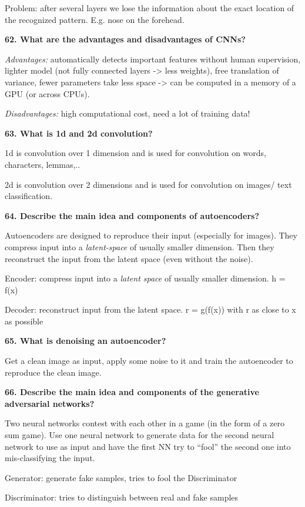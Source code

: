 Problem: after several layers we lose the information about the exact
location of the recognized pattern. E.g. nose on the forehead.

\textbf{62. What are the advantages and disadvantages of CNNs?}

\textit{Advantages:} automatically detects important features without
human supervision, lighter model (not fully connected layers
-\textgreater{} less weights), free translation of variance, fewer
parameters take less space -\textgreater{} can be computed in a memory
of a GPU (or across CPUs).

\textit{Disadvantages:} high computational cost, need a lot of
training data!

\textbf{63. What is 1d and 2d convolution?}

1d is convolution over 1 dimension and is used for convolution on words,
characters, lemmas,..

2d is convolution over 2 dimensions and is used for convolution on
images/ text classification.

\textbf{64. Describe the main idea and components of autoencoders?}

Autoencoders are designed to reproduce their input (especially for
images). They compress input into a \emph{latent-space} of usually
smaller dimension. Then they reconstruct the input from the latent space
(even without the noise).

Encoder: compress input into a \emph{latent space} of usually smaller
dimension. h = f(x)

Decoder: reconstruct input from the latent space. r = g(f(x)) with r as
close to x as possible

\textbf{65. What is denoising an autoencoder?}

Get a clean image as input, apply some noise to it and train the
autoencoder to reproduce the clean image.

\textbf{66. Describe the main idea and components of the generative
adversarial networks?}

Two neural networks contest with each other in a game (in the form of a
zero sum game). Use one neural network to generate data for the second
neural network to use as input and have the first NN try to ``fool'' the
second one into mis-classifying the input.

Generator: generate fake samples, tries to fool the Discriminator

Discriminator: tries to distinguish between real and fake samples

